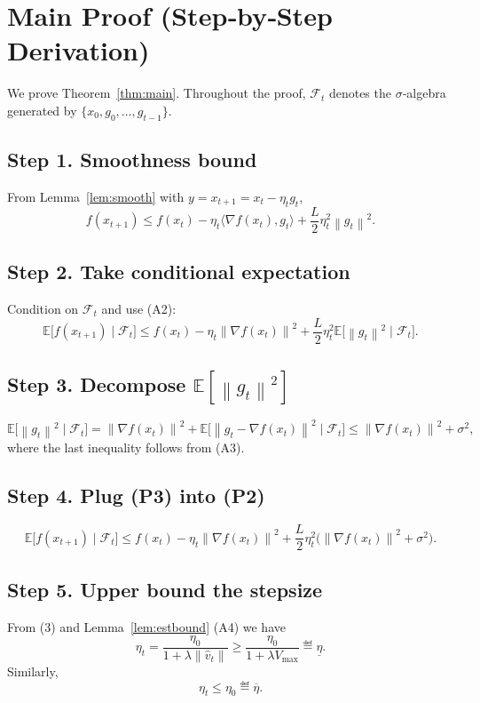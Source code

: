 \documentclass{article}
\newcommand{\E}{\mathbb{E}}
\newcommand{\norm}[1]{\left\|#1\right\|}
\newcommand{\ip}[2]{\langle #1,#2\rangle}
\newcommand{\grad}{\nabla}
\begin{document}
\section*{Main Proof (Step‑by‑Step Derivation)}
We prove Theorem~\ref{thm:main}. Throughout the proof, $\mathcal F_{t}$ denotes the $\sigma$‑algebra generated by $\{x_{0},g_{0},\dots,g_{t-1}\}$.

\subsection*{Step 1. Smoothness bound}
From Lemma~\ref{lem:smooth} with $y=x_{t+1}=x_{t}-\eta_{t}g_{t}$,
\[
f(x_{t+1})\le f(x_{t})-\eta_{t}\ip{\grad f(x_{t})}{g_{t}}
          +\frac{L}{2}\eta_{t}^{2}\norm{g_{t}}^{2}.
\tag{P1}
\]

\subsection*{Step 2. Take conditional expectation}
Condition on $\mathcal F_{t}$ and use (A2):
\[
\E\!\bigl[f(x_{t+1})\mid\mathcal F_{t}\bigr]
\le f(x_{t})-\eta_{t}\norm{\grad f(x_{t})}^{2}
     +\frac{L}{2}\eta_{t}^{2}\E\!\bigl[\norm{g_{t}}^{2}\mid\mathcal F_{t}\bigr].
\tag{P2}
\]

\subsection*{Step 3. Decompose $\E[\norm{g_{t}}^{2}]$}
\[
\E\!\bigl[\norm{g_{t}}^{2}\mid\mathcal F_{t}\bigr]
= \norm{\grad f(x_{t})}^{2}
  +\E\!\bigl[\norm{g_{t}-\grad f(x_{t})}^{2}\mid\mathcal F_{t}\bigr]
\le \norm{\grad f(x_{t})}^{2}+\sigma^{2},
\tag{P3}
\]
where the last inequality follows from (A3).

\subsection*{Step 4. Plug (P3) into (P2)}
\[
\E\!\bigl[f(x_{t+1})\mid\mathcal F_{t}\bigr]
\le f(x_{t})-\eta_{t}\norm{\grad f(x_{t})}^{2}
     +\frac{L}{2}\eta_{t}^{2}\bigl(\norm{\grad f(x_{t})}^{2}+\sigma^{2}\bigr).
\tag{P4}
\]

\subsection*{Step 5. Upper bound the stepsize}
From (3) and Lemma~\ref{lem:estbound} (A4) we have
\[
\eta_{t}= \frac{\eta_{0}}{1+\lambda\norm{\hat v_{t}}}
\ge \frac{\eta_{0}}{1+\lambda V_{\max}}
\eqdef \underline{\eta}.
\tag{P5}
\]
Similarly,
\[
\eta_{t}\le \eta_{0}\eqdef \overline{\eta}.
\tag{P6}
\]
\end{document}

